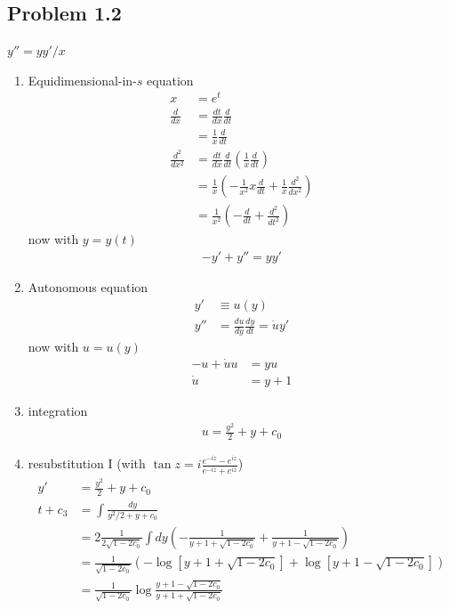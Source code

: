 \documentclass[10pt,a4paper]{book}
\theoremstyle{definition}
\begin{document}
\subsection{Problem 1.2}
$y''=yy'/x$
\begin{enumerate}
    \item Equidimensional-in-$s$ equation
    \begin{align}
        x&=e^t\\
        \frac{d}{dx}&=\frac{dt}{dx}\frac{d}{dt}\\
        &=\frac{1}{x}\frac{d}{dt}\\
        \frac{d^2}{dx^2}&=\frac{dt}{dx}\frac{d}{dt}\left(\frac{1}{x}\frac{d}{dt}\right)\\
        &=\frac{1}{x}\left(-\frac{1}{x^2}x\frac{d}{dt}+\frac{1}{x}\frac{d^2}{dx^2}\right)\\
        &=\frac{1}{x^2}\left(-\frac{d}{dt}+\frac{d^2}{dt^2}\right)
    \end{align}
    now with $y=y(t)$
    \begin{align}
        -y'+y''=yy'
    \end{align}
    \item Autonomous equation
    \begin{align}
        y'&\equiv u(y)\\
        y''&=\frac{du}{dy}\frac{dy}{dt}=\dot u y'
    \end{align}
    now with $u=u(y)$
    \begin{align}
        -u+\dot u u&=y u\\
        \dot u&=y+1
    \end{align}
    \item integration
    \begin{align}
        u=\frac{y^2}{2}+y+c_0
    \end{align}
    \item resubstitution I (with $\tan z = i\frac{e^{-iz}-e^{iz}}{e^{-iz}+e^{iz}}$)
    \begin{align}
        y'&=\frac{y^2}{2}+y+c_0\\
        t+c_3&=\int\frac{dy}{y^2/2+y+c_0}\\
        &=2\frac{1}{2\sqrt{1-2c_0}}\int dy\left(-\frac{1}{y+1+\sqrt{1-2c_0}}+\frac{1}{y+1-\sqrt{1-2c_0}}\right)\\
        &=\frac{1}{\sqrt{1-2c_0}}\left(-\log\left[y+1+\sqrt{1-2c_0}\right]+\log\left[y+1-\sqrt{1-2c_0}\right]\right)\\
        &=\frac{1}{\sqrt{1-2c_0}}\log\frac{y+1-\sqrt{1-2c_0}}{y+1+\sqrt{1-2c_0}}\\

\end{align}
\end{enumerate}
\end{document}
